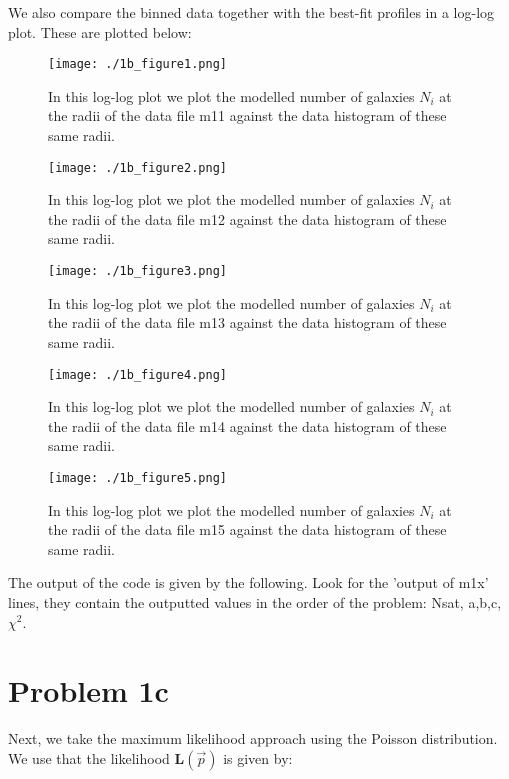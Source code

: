 We also compare the binned data together with the best-fit profiles in a log-log plot. These are plotted below:

\begin{figure}[h!]
  \centering
  \texttt{[image: ./1b\_figure1.png]}
  \caption{In this log-log plot we plot the modelled number of galaxies $N_i$ at the radii of the data file m11 against the data histogram of these same radii.}
\end{figure}

\begin{figure}[h!]
  \centering
  \texttt{[image: ./1b\_figure2.png]}
  \caption{In this log-log plot we plot the modelled number of galaxies $N_i$ at the radii of the data file m12 against the data histogram of these same radii.}
\end{figure}

\begin{figure}[h!]
  \centering
  \texttt{[image: ./1b\_figure3.png]}
  \caption{In this log-log plot we plot the modelled number of galaxies $N_i$ at the radii of the data file m13 against the data histogram of these same radii.}
\end{figure}

\begin{figure}[h!]
  \centering
  \texttt{[image: ./1b\_figure4.png]}
  \caption{In this log-log plot we plot the modelled number of galaxies $N_i$ at the radii of the data file m14 against the data histogram of these same radii.}
\end{figure}

\begin{figure}[h!]
  \centering
  \texttt{[image: ./1b\_figure5.png]}
  \caption{In this log-log plot we plot the modelled number of galaxies $N_i$ at the radii of the data file m15 against the data histogram of these same radii.}
\end{figure}


The output of the code is given by the following. Look for the 'output of m1x' lines, they contain the outputted values in the order of the problem: Nsat, a,b,c, $\chi^2$.



\section*{Problem 1c}

Next, we take the maximum likelihood approach using the Poisson distribution. We use that the likelihood $\textbf{L}(\vec{p})$ is given by:

